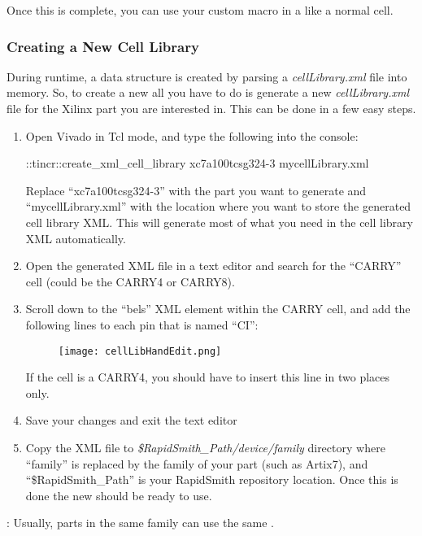 \noindent
Once this is complete, you can use your custom macro in a  like
a normal cell.

\subsubsection{Creating a New Cell Library}
During runtime, a  data structure is created by parsing a
\textit{cellLibrary.xml} file into memory. So, to create a new 
all you have to do is generate a new \textit{cellLibrary.xml} file for the
Xilinx part you are interested in. This can be done in a few easy steps.

\begin{enumerate}
  \item Open Vivado in Tcl mode, and type the following into the console:
  \begin{code}
::tincr::create_xml_cell_library xc7a100tcsg324-3 mycellLibrary.xml
  \end{code}
  Replace ``xc7a100tcsg324-3'' with the part you want to generate and
  ``mycellLibrary.xml'' with the location where you want to store the generated
  cell library XML. This will generate most of what you need in the cell library
  XML automatically.
  \item Open the generated XML file in a text editor and search for the
  ``CARRY'' cell (could be the CARRY4 or CARRY8).
  \item Scroll down to the ``bels'' XML element within the CARRY cell,
  and add the following lines to each pin that is named ``CI'':
  
  \begin{figure}[H]
   \centering
   \texttt{[image: cellLibHandEdit.png]}
  \end{figure}
  
  If the cell is a CARRY4, you should have to insert this line in two places
  only.
  \item Save your changes and exit the text editor
  \item Copy the XML file to \textit{\$RapidSmith\_Path/device/family}
  directory where ``family'' is replaced by the family of your part (such as
  Artix7), and ``\$RapidSmith\_Path'' is your RapidSmith repository location.
  Once this is done the new  should be ready to use. 
\end{enumerate}

: Usually, parts in the same family can use the same
.

